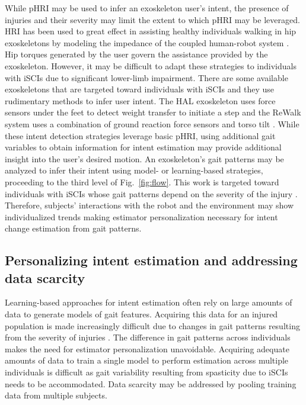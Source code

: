 While pHRI may be used to infer an exoskeleton user's intent, the presence of injuries and their severity may limit the extent to which pHRI may be leveraged. HRI has been used to great effect in assisting healthy individuals walking in hip exoskeletons by modeling the impedance of the coupled human-robot system \cite{zhang2019admittance,nagarajan2016integral}. Hip torques generated by the user govern the assistance provided by the exoskeleton. However, it may be difficult to adapt these strategies to individuals with iSCIs due to significant lower-limb impairment. There are some available exoskeletons that are targeted toward individuals with iSCIs and they use rudimentary methods to infer user intent. The HAL exoskeleton uses force sensors under the feet to detect weight transfer to initiate a step \cite{suzuki2007intention} and the ReWalk system uses a combination of ground reaction force sensors and torso tilt \cite{goffer2012locomotion}. While these intent detection strategies leverage basic pHRI, using additional gait variables to obtain information for intent estimation may provide additional insight into the user's desired motion. An exoskeleton's gait patterns may be analyzed to infer their intent using model- or learning-based strategies, proceeding to the third level of Fig.~\ref{fig:flow}. This work is targeted toward individuals with iSCIs whose gait patterns depend on the severity of the injury \cite{rota2011walk}. Therefore, subjects' interactions with the robot and the environment may show individualized trends making estimator personalization necessary for intent change estimation from gait patterns. 

\subsection{Personalizing intent estimation and addressing data scarcity}

Learning-based approaches for intent estimation often rely on large amounts of data to generate models of gait features\cite{lee2020image,moolchandani2021design}. Acquiring this data for an injured population is made increasingly difficult due to changes in gait patterns resulting from the severity of injuries \cite{sohn2018variability}. The difference in gait patterns across individuals makes the need for estimator personalization unavoidable. Acquiring adequate amounts of data to train a single model to perform estimation across multiple individuals is difficult as gait variability resulting from spasticity due to iSCIs \cite{krawetz1996gait} needs to be accommodated. Data scarcity may be addressed by pooling training data from multiple subjects.

